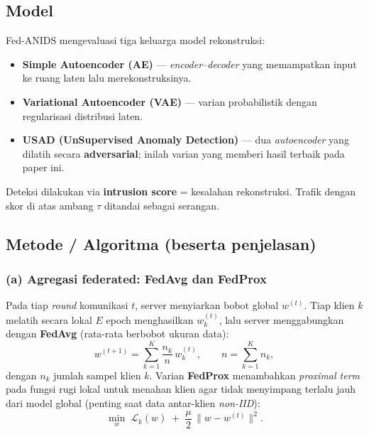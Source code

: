 \documentclass[11pt,a4paper]{article}
\begin{document}
\subsection{Model}
Fed-ANIDS mengevaluasi tiga keluarga model rekonstruksi:
\begin{itemize}[leftmargin=1.4em]
  \item \textbf{Simple Autoencoder (AE)} --- \emph{encoder}--\emph{decoder}
  yang memampatkan input ke ruang laten lalu merekonstruksinya.
  \item \textbf{Variational Autoencoder (VAE)} --- varian probabilistik dengan
  regularisasi distribusi laten.
  \item \textbf{USAD (UnSupervised Anomaly Detection)} --- dua
  \emph{autoencoder} yang dilatih secara \textbf{adversarial}; inilah varian
  yang memberi hasil terbaik pada paper ini.
\end{itemize}
Deteksi dilakukan via \textbf{intrusion score} = kesalahan rekonstruksi.
Trafik dengan skor di atas ambang $\tau$ ditandai sebagai serangan.

\subsection{Metode / Algoritma (beserta penjelasan)}

\subsubsection*{(a) Agregasi federated: FedAvg dan FedProx}
Pada tiap \emph{round} komunikasi $t$, server menyiarkan bobot global $w^{(t)}$.
Tiap klien $k$ melatih secara lokal $E$ epoch menghasilkan $w_k^{(t)}$, lalu
server menggabungkan dengan \textbf{FedAvg} (rata-rata berbobot ukuran data):
\begin{equation}
w^{(t+1)} = \sum_{k=1}^{K} \frac{n_k}{n}\, w_k^{(t)},
\qquad n = \sum_{k=1}^{K} n_k ,
\end{equation}
dengan $n_k$ jumlah sampel klien $k$. Varian \textbf{FedProx} menambahkan
\emph{proximal term} pada fungsi rugi lokal untuk menahan klien agar tidak
menyimpang terlalu jauh dari model global (penting saat data antar-klien
\emph{non-IID}):
\begin{equation}
\min_{w}\; \mathcal{L}_k(w) \;+\; \frac{\mu}{2}\,\lVert w - w^{(t)} \rVert^2 .
\end{equation}
\end{document}
